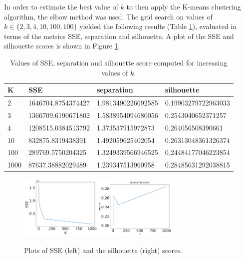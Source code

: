 \documentclass[10pt,a4paper]{report}
\begin{document}
In order to estimate the best value of $k$ to then apply the K-means clustering algorithm, the elbow method was used.
The grid search on values of $k \in \{2, 3, 4, 10, 100, 100\}$ yielded the following results (Table \ref{table02}), evaluated in terms of the metrics SSE, separation and silhouette.
A plot of the SSE and silhouette scores is shown in Figure \ref{kmeans_k}.
\begin{table}[h]
	\centering
	\begin{small}
		\begin{tabular}{l|p{4cm}|p{4cm}|p{4cm}}
		\textbf{K} & \textbf{SSE} & \textbf{separation} & \textbf{silhouette}\\
		\hline
		2 & 1646704.8754374427 & 1.9813490226692585 & 0.19903279722963033\\
		3 & 1366709.6190671802 & 1.5838954094680056 & 0.2543040652371257\\
		4 & 1208515.0384513792 & 1.373537915972873 & 0.264056508390661\\
		10 & 832875.8319438391 & 1.492059625402054 & 0.26313048361326374\\
		100 & 289769.5750204325 & 1.3249339566946525 & 0.24484177046223854\\
		1000 & 87637.38882029489 & 1.239347513960958 & 0.28485631292038815\\
	\end{tabular}
	\end{small}
	\caption{Values of SSE, separation and silhouette score computed for increasing values of $k$.}
	\label{table02}
\end{table}
\begin{figure}[h]
	\centering
	\includegraphics[width=0.35\textwidth]{kmeans_sse}\includegraphics[width=0.35\textwidth]{kmeans_silhouette}
	\caption{Plots of SSE (left) and the silhouette (right) scores.}
	\label{kmeans_k}
\end{figure}
\end{document}
